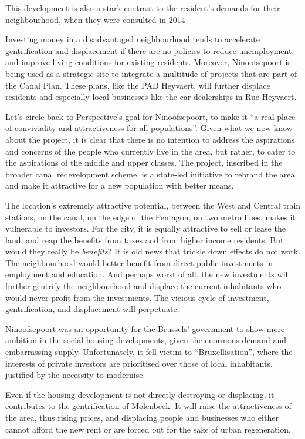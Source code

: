 \documentclass{article}[11pt]
\begin{document}
This development is also a stark contrast to the resident's demands for their neighbourhood, when they were consulted in 2014

Investing money in a disadvantaged neighbourhood tends to accelerate gentrification and displacement if there are no policies to reduce unemployment, and improve living conditions for existing residents.
Moreover, Ninoofsepoort is being used as a strategic site to integrate a multitude of projects that are part of the Canal Plan. These plans, like the PAD Heyvaert, will further displace residents and especially local businesses like the car dealerships in Rue Heyvaert.

Let's circle back to Perspective's goal for Ninoofsepoort, to make it ``a real place of conviviality and attractiveness for all populations''. Given what we now know about the project, it is clear that there is no intention to address the aspirations and concerns of the people who currently live in the area, but rather, to cater to the aspirations of the middle and upper classes.
The project, inscribed in the broader canal redevelopment scheme, is a state-led initiative to rebrand the area and make it attractive for a new population with better means.

The location's extremely attractive potential, between the West and Central train stations, on the canal, on the edge of the Pentagon, on two metro lines, makes it vulnerable to investors. For the city, it is equally attractive to sell or lease the land, and reap the benefits from taxes and from higher income residents. But would they really be \textit{benefits}? It is old news that trickle down effects do not work. The neighbourhood would better benefit from direct public investments in employment and education. And perhaps worst of all, the new investments will further gentrify the neighbourhood and displace the current inhabitants who would never profit from the investments.
The vicious cycle of investment, gentrification, and displacement will perpetuate.


Ninoofsepoort was an opportunity for the Brussels' government to show more ambition in the social housing developments, given the enormous demand and embarrassing supply. Unfortunately, it fell victim to ``Bruxellisation'', where the interests of private investors are prioritised over those of local inhabitants, justified by the necessity to modernise. 

Even if the housing development is not directly destroying or displacing, it contributes to the gentrification of Molenbeek. It will raise the attractiveness of the area, thus rising prices, and displacing people and businesses who either cannot afford the new rent or are forced out for the sake of urban regeneration.

\pagebreak

\printbibliography 
\end{document}
